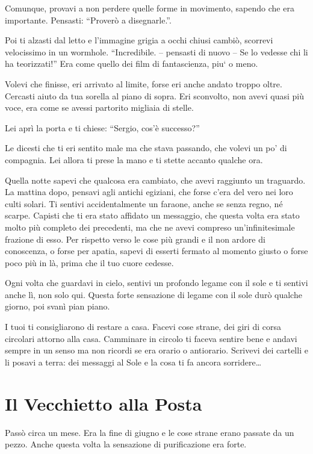 Comunque, provavi a non perdere quelle forme in movimento, sapendo che era importante. Pensasti: ``Proverò a disegnarle.''.

Poi ti alzasti dal letto e l'immagine grigia a occhi chiusi cambiò, scorrevi velocissimo in un wormhole. ``Incredibile. -- pensasti di nuovo -- Se lo vedesse chi li ha teorizzati!'' Era come quello dei film di fantascienza, piu` o meno.

Volevi che finisse, eri arrivato al limite, forse eri anche andato troppo oltre. Cercasti aiuto da tua sorella al piano di sopra. Eri sconvolto, non avevi quasi più voce, era come se avessi partorito migliaia di stelle.

Lei aprì la porta e ti chiese: “Sergio, cos'è successo?”

Le dicesti che ti eri sentito male ma che stava passando, che volevi un po' di compagnia. Lei allora ti prese la mano e ti stette accanto qualche ora.

Quella notte sapevi che qualcosa era cambiato, che avevi raggiunto un traguardo. La mattina dopo, pensavi agli antichi egiziani, che forse c'era del vero nei loro culti solari. Ti sentivi accidentalmente un faraone, anche se senza regno, né scarpe. Capisti che ti era stato affidato un messaggio, che questa volta era stato molto più completo dei precedenti, ma che ne avevi compreso un'infinitesimale frazione di esso. Per rispetto verso le cose più grandi e il non ardore di conoscenza, o forse per apatia, sapevi di esserti fermato al momento giusto o forse poco più in là, prima che il tuo cuore cedesse.

Ogni volta che guardavi in cielo, sentivi un profondo legame con il sole e ti sentivi anche lì, non solo qui. Questa forte sensazione di legame con il sole durò qualche giorno, poi svanì pian piano.

I tuoi ti consigliarono di restare a casa. Facevi cose strane, dei giri di corsa circolari attorno alla casa. Camminare in circolo ti faceva sentire bene e andavi sempre in un senso ma non ricordi se era orario o antiorario. Scrivevi dei cartelli e li posavi a terra: dei messaggi al Sole e la cosa ti fa ancora sorridere\ldots

\section{Il Vecchietto alla Posta}
\label{il_vecchietto}

Passò circa un mese. Era la fine di giugno e le cose strane erano passate da un pezzo. Anche questa volta la sensazione di purificazione era forte.

